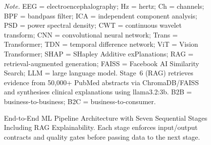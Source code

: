 \begin{figure}[!htbp]
{%
}%
\caption[ML Pipeline Architecture (7 Stages)]{End-to-End ML Pipeline Architecture with Seven Sequential Stages Including RAG Explainability. Each stage enforces input/output contracts and quality gates before passing data to the next stage.}
\label{app_fig:ml_pipeline_arch}

\vspace{0.5em}\noindent\textit{Note.} EEG = electroencephalography; Hz = hertz; Ch = channels; BPF = bandpass filter; ICA = independent component analysis; PSD = power spectral density; CWT = continuous wavelet transform; CNN = convolutional neural network; Trans = Transformer; TDN = temporal difference network; ViT = Vision Transformer; SHAP = SHapley Additive exPlanations; RAG = retrieval-augmented generation; FAISS = Facebook AI Similarity Search; LLM = large language model. Stage~6 (RAG) retrieves evidence from 50{,}000+ PubMed abstracts via ChromaDB/FAISS and synthesises clinical explanations using llama3.2:3b. B2B = business-to-business; B2C = business-to-consumer.
\end{figure}

